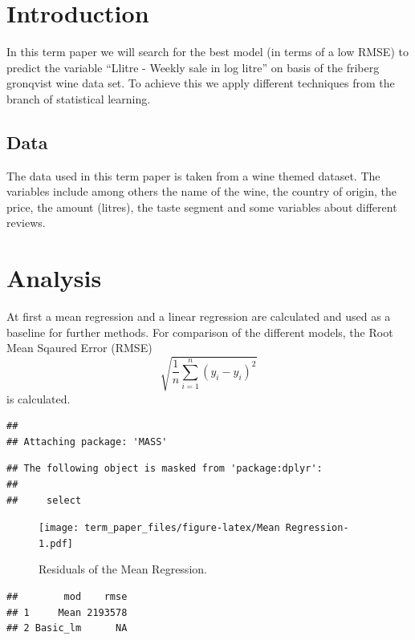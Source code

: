 \documentclass[11pt,]{article}
\begin{document}
{
\hypersetup{linkcolor=black}
\setcounter{tocdepth}{3}
\tableofcontents
}
\newpage
\listoftables
\newpage
\listoffigures
\newpage
{} 
\section{Introduction}\label{introduction}

In this term paper we will search for the best model (in terms of a low
RMSE) to predict the variable \enquote{Llitre - Weekly sale in log
litre} on basis of the friberg gronqvist wine data set. To achieve this
we apply different techniques from the branch of statistical learning.

\subsection{Data}\label{data}

The data used in this term paper is taken from a wine themed dataset.
The variables include among others the name of the wine, the country of
origin, the price, the amount (litres), the taste segment and some
variables about different reviews.

\section{Analysis}\label{analysis}

At first a mean regression and a linear regression are calculated and
used as a baseline for further methods. For comparison of the different
models, the Root Mean Sqaured Error (RMSE)
\[\sqrt{\frac{1}{n}\sum_{i = 1}^{n}\left(y_i-\hat{y}_i\right)^2}\] is
calculated.

\begin{verbatim}
## 
## Attaching package: 'MASS'
\end{verbatim}

\begin{verbatim}
## The following object is masked from 'package:dplyr':
## 
##     select
\end{verbatim}

\begin{figure}
\centering
\texttt{[image: term\_paper\_files/figure-latex/Mean Regression-1.pdf]}
\caption{Residuals of the Mean Regression.}
\end{figure}

\begin{verbatim}
##        mod    rmse
## 1     Mean 2193578
## 2 Basic_lm      NA
\end{verbatim}
\end{document}
